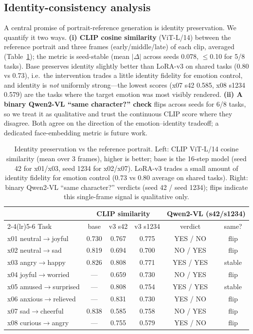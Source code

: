\documentclass[conference]{IEEEtran}
\begin{document}
\subsection{Identity-consistency analysis}
A central promise of portrait-reference generation is identity preservation. We quantify it two ways.
\textbf{(i) CLIP cosine similarity} (ViT-L/14) between the reference portrait and three frames
(early/middle/late) of each clip, averaged (Table~\ref{tab:identity}); the metric is seed-stable (mean
$|\Delta|$ across seeds 0.078, $\le$0.10 for 5/8 tasks). Base preserves identity slightly better than
LoRA-v3 on shared tasks (0.80 vs 0.73), i.e.\ the intervention trades a little identity fidelity for
emotion control, and identity is \emph{not} uniformly strong---the lowest scores (x07 s42 0.585, x08
s1234 0.579) are the tasks where the target emotion was most visibly rendered. \textbf{(ii) A binary
Qwen2-VL ``same character?'' check} flips across seeds for 6/8 tasks, so we treat it as qualitative and
trust the continuous CLIP score where they disagree. Both agree on the direction of the
emotion--identity tradeoff; a dedicated face-embedding metric is future work.

\begin{table}[!t]
\centering\small
\caption{Identity preservation vs the reference portrait. Left: CLIP ViT-L/14 cosine similarity
(mean over 3 frames), higher is better; base is the 16-step model (seed 42 for x01/x03, seed 1234
for x02/x07). LoRA-v3 trades a small amount of identity fidelity for emotion control (0.73 vs 0.80
average on shared tasks). Right: binary Qwen2-VL ``same character?'' verdicts (seed 42 / seed 1234);
flips indicate this single-frame signal is qualitative only.}
\label{tab:identity}
\begin{tabular}{@{}lccccc@{}}
\toprule
 & \multicolumn{3}{c}{CLIP similarity} & \multicolumn{2}{c}{Qwen2-VL (s42/s1234)}\\
\cmidrule(lr){2-4}\cmidrule(lr){5-6}
Task & base & v3 s42 & v3 s1234 & verdict & same?\\
\midrule
x01 neutral$\rightarrow$joyful & 0.730 & 0.767 & 0.775 & YES / NO & flip\\
x02 neutral$\rightarrow$sad & 0.819 & 0.694 & 0.700 & NO / YES & flip\\
x03 angry$\rightarrow$happy & 0.826 & 0.808 & 0.771 & YES / YES & stable\\
x04 joyful$\rightarrow$worried & --- & 0.659 & 0.730 & NO / YES & flip\\
x05 amused$\rightarrow$surprised & --- & 0.808 & 0.754 & YES / YES & stable\\
x06 anxious$\rightarrow$relieved & --- & 0.831 & 0.730 & YES / NO & flip\\
x07 sad$\rightarrow$cheerful & 0.838 & 0.585 & 0.758 & NO / YES & flip\\
x08 curious$\rightarrow$angry & --- & 0.755 & 0.579 & YES / NO & flip\\
\bottomrule
\end{tabular}
\end{table}
\end{document}
